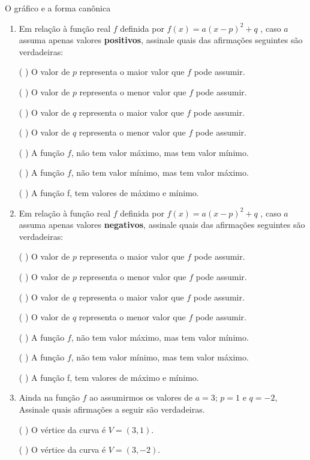 \begin{task}{O gráfico e a forma canônica}
\begin{enumerate}
({ }{ }{ }) \(D=\mathbb{R}\) e \(I=\mathbb{R}\)

\item {} 
Em relação à função real \(f\) definida por \(f(x)=a(x-p)^2+q\) , caso \(a\) assuma apenas valores \textbf{positivos}, assinale quais das afirmações seguintes são verdadeiras:

({ }{ }{ }) O valor de \(p\) representa o maior valor que \(f\) pode assumir.

({ }{ }{ }) O valor de \(p\) representa o menor valor que \(f\) pode assumir.

({ }{ }{ }) O valor de \(q\) representa o maior valor que \(f\) pode assumir.

({ }{ }{ }) O valor de \(q\) representa o menor valor que \(f\) pode assumir.

({ }{ }{ }) A função \(f\), não tem valor máximo, mas tem valor mínimo.

({ }{ }{ }) A função \(f\), não tem valor mínimo, mas tem valor máximo.

({ }{ }{ }) A função f, tem valores de máximo e mínimo.

\item {} 
Em relação à função real \(f\) definida por \(f(x)=a(x-p)^2+q\) , caso \(a\) assuma apenas valores \textbf{negativos}, assinale quais das afirmações seguintes são verdadeiras:

({ }{ }{ }) O valor de \(p\) representa o maior valor que \(f\) pode assumir.

({ }{ }{ }) O valor de \(p\) representa o menor valor que \(f\) pode assumir.

({ }{ }{ }) O valor de \(q\) representa o maior valor que \(f\) pode assumir.

({ }{ }{ }) O valor de \(q\) representa o menor valor que \(f\) pode assumir.

({ }{ }{ }) A função \(f\), não tem valor máximo, mas tem valor mínimo.

({ }{ }{ }) A função \(f\), não tem valor mínimo, mas tem valor máximo.

({ }{ }{ }) A função f, tem valores de máximo e mínimo.

\item {} 
Ainda na função \(f\) ao assumirmos os valores de \(a=3\);  \(p=1\) e \(q=-2\), Assinale quais afirmações a seguir são verdadeiras.

({ }{ }{ }) O vértice da curva é \(V=(3,1)\).

({ }{ }{ }) O vértice da curva é \(V=(3,-2)\).


\end{enumerate}
\end{task}
